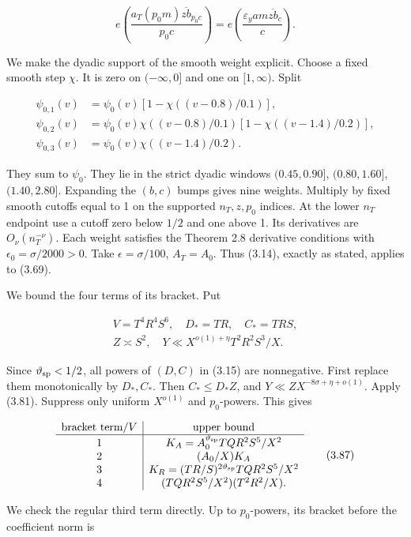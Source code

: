 \[
e\left(\frac{a_T(p_0m)\overline{zb}_{p_0c}}{p_0c}\right)
 =e\left(\frac{\varepsilon_y a m\overline{zb}_c}{c}\right).
\tag{3.84}
\]

We make the dyadic support of the smooth weight explicit.
Choose a fixed smooth step $\chi$. It is zero on $(-\infty,0]$ and one
on $[1,\infty)$. Split

\[
\begin{aligned}
\psi_{0,1}(v)&=\psi_0(v)[1-\chi((v-0.8)/0.1)],\\
\psi_{0,2}(v)&=\psi_0(v)\chi((v-0.8)/0.1)[1-\chi((v-1.4)/0.2)],\\
\psi_{0,3}(v)&=\psi_0(v)\chi((v-1.4)/0.2).
\end{aligned}
\tag{3.85}
\]

They sum to $\psi_0$.
They lie in the strict dyadic windows $(0.45,0.90]$, $(0.80,1.60]$, $(1.40,2.80]$.
Expanding the $(b,c)$ bumps gives nine weights.
Multiply by fixed smooth cutoffs equal to 1 on the supported $n_T,z,p_0$ indices.
At the lower $n_T$ endpoint use a cutoff zero below $1/2$ and one above 1.
Its derivatives are $O_\nu(n_T^{-\nu})$.
Each weight satisfies the Theorem 2.8 derivative conditions with
$\epsilon_0=\sigma/2000>0$. Take $\epsilon=\sigma/100$,
$A_T=A_0$. Thus (3.14), exactly as stated, applies to (3.69).

We bound the four terms of its bracket. Put

\[
\begin{gathered}
V=T^4R^4S^6,\quad D_*=TR,\quad C_*=TRS,\\
Z\asymp S^2,\quad Y\ll X^{o(1)+\eta}T^2R^2S^3/X.
\end{gathered}
\tag{3.86}
\]

Since $\vartheta_{\rm sp}<1/2$, all powers of $(D,C)$ in (3.15) are nonnegative.
First replace them monotonically by $D_*,C_*$.
Then $C_*\le D_*Z$, and $Y\ll ZX^{-8\sigma+\eta+o(1)}$.
Apply (3.81). Suppress only uniform $X^{o(1)}$ and $p_0$-powers. This gives

\[
\begin{array}{c|c}
\text{bracket term}/V&\text{upper bound}\\ \hline
1&K_A=A_0^{\vartheta_{\rm sp}} TQR^2S^5/X^2\\
2&(A_0/X)K_A\\
3&K_R=(TR/S)^{2\vartheta_{\rm sp}}TQR^2S^5/X^2\\
4&(TQR^2S^5/X^2)(T^2R^2/X).
\end{array}
\tag{3.87}
\]

We check the regular third term directly.
Up to $p_0$-powers, its bracket before the coefficient norm is

